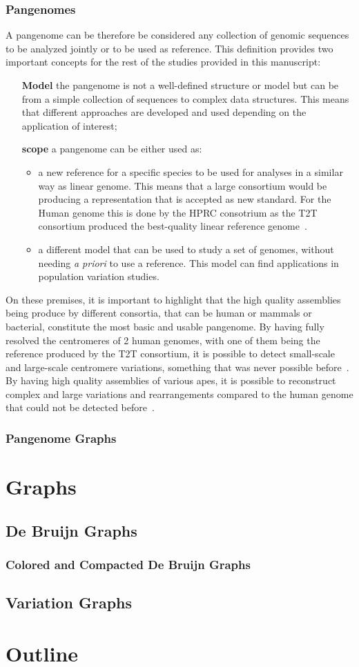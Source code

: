 \subsubsection{Pangenomes}
A pangenome can be therefore be considered any collection of genomic sequences to be analyzed jointly or to be used as reference. This definition provides two important concepts for the rest of the studies provided in this manuscript: 
\begin{itemize}
	\item[\textbf{Model}] the pangenome is not a well-defined structure or model but can be from a simple collection of sequences to complex data structures. This means that different approaches are developed and used depending on the application of interest;
	\item[\textbf{scope}] a pangenome can be either used as:
	\begin{itemize}
		\item a new reference for a specific species to be used for analyses in a similar way as linear genome. This means that a large consortium would be producing a representation that is accepted as new standard. For the Human genome this is done by the HPRC consotrium as the T2T consortium produced the best-quality linear reference genome~\cite{t2t}.
		\item a different model that can be used to study a set of genomes, without needing \emph{a priori} to use a reference. This model can find applications in population variation studies. 
	\end{itemize} 
\end{itemize}
On these premises, it is important to highlight that the high quality assemblies being produce by different consortia, that can be human or mammals or bacterial, constitute the most basic and usable pangenome. By having fully resolved the centromeres of 2 human genomes, with one of them being the reference produced by the T2T consortium, it is possible to detect small-scale and large-scale centromere variations, something that was never possible before~\cite{centromeres_eichler}. By having high quality assemblies of various apes, it is possible to reconstruct complex and large variations and rearrangements compared to the human genome that could not be detected before~\cite{apes_genomes}.

\subsubsection{Pangenome Graphs}

\section{Graphs}

\subsection{De Bruijn Graphs}
\subsubsection{Colored and Compacted De Bruijn Graphs}
\subsection{Variation Graphs}
\section{Outline}
